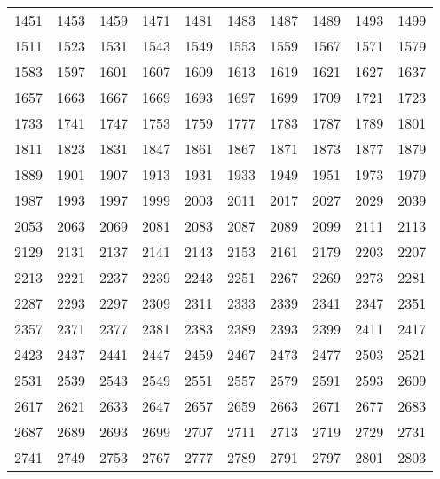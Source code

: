 \begin{center}
\begin{tabular}{llllllllll}
1451 &1453 &1459 &1471 &1481 &1483 &1487 &1489 &1493 &1499 \\
1511 &1523 &1531 &1543 &1549 &1553 &1559 &1567 &1571 &1579 \\
1583 &1597 &1601 &1607 &1609 &1613 &1619 &1621 &1627 &1637 \\
1657 &1663 &1667 &1669 &1693 &1697 &1699 &1709 &1721 &1723 \\
1733 &1741 &1747 &1753 &1759 &1777 &1783 &1787 &1789 &1801 \\
1811 &1823 &1831 &1847 &1861 &1867 &1871 &1873 &1877 &1879 \\
1889 &1901 &1907 &1913 &1931 &1933 &1949 &1951 &1973 &1979 \\
1987 &1993 &1997 &1999 &2003 &2011 &2017 &2027 &2029 &2039 \\
2053 &2063 &2069 &2081 &2083 &2087 &2089 &2099 &2111 &2113 \\
2129 &2131 &2137 &2141 &2143 &2153 &2161 &2179 &2203 &2207 \\
2213 &2221 &2237 &2239 &2243 &2251 &2267 &2269 &2273 &2281 \\
2287 &2293 &2297 &2309 &2311 &2333 &2339 &2341 &2347 &2351 \\
2357 &2371 &2377 &2381 &2383 &2389 &2393 &2399 &2411 &2417 \\
2423 &2437 &2441 &2447 &2459 &2467 &2473 &2477 &2503 &2521 \\
2531 &2539 &2543 &2549 &2551 &2557 &2579 &2591 &2593 &2609 \\
2617 &2621 &2633 &2647 &2657 &2659 &2663 &2671 &2677 &2683 \\
2687 &2689 &2693 &2699 &2707 &2711 &2713 &2719 &2729 &2731 \\
2741 &2749 &2753 &2767 &2777 &2789 &2791 &2797 &2801 &2803 \\
\bottomrule
\end{tabular}
\end{center}
